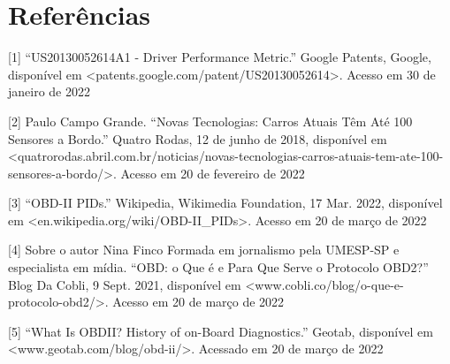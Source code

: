 \chapter{Referências}

[1] “US20130052614A1 - Driver Performance Metric.” Google Patents, Google, disponível em <patents.google.com/patent/US20130052614>. Acesso em 30 de janeiro de 2022

[2] Paulo Campo Grande. “Novas Tecnologias: Carros Atuais Têm Até 100 Sensores a Bordo.” Quatro Rodas, 12 de junho de 2018, disponível em <quatrorodas.abril.com.br/noticias/novas-tecnologias-carros-atuais-tem-ate-100-sensores-a-bordo/>. Acesso em 20 de fevereiro de 2022

[3] “OBD-II PIDs.” Wikipedia, Wikimedia Foundation, 17 Mar. 2022, disponível em <en.wikipedia.org/wiki/OBD-II_PIDs>. Acesso em 20 de março de 2022

[4] Sobre o autor Nina Finco Formada em jornalismo pela UMESP-SP e especialista em mídia. “OBD: o Que é e Para Que Serve o Protocolo OBD2?” Blog Da Cobli, 9 Sept. 2021, disponível em <www.cobli.co/blog/o-que-e-protocolo-obd2/>. Acesso em 20 de março de 2022

[5] “What Is OBDII? History of on-Board Diagnostics.” Geotab, disponível em <www.geotab.com/blog/obd-ii/>. Acessado em 20 de março de 2022

